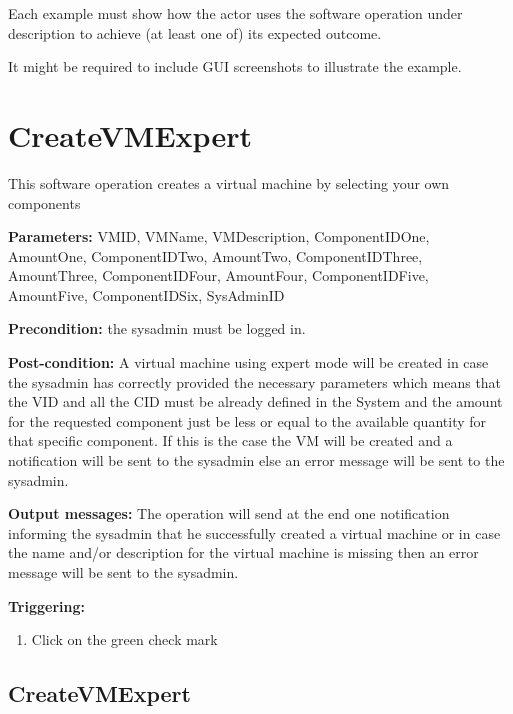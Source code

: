 Each example must show how the actor uses the software operation under
description to achieve (at least one of) its expected outcome.

It might be required to include GUI screenshots to illustrate the example.





\section{CreateVMExpert}
\label{operation:CreateVMExpert}
This software operation creates a virtual machine by selecting your own
components
\begin{description}

\item \textbf{Parameters:} VMID, VMName, VMDescription, ComponentIDOne,
AmountOne, ComponentIDTwo, AmountTwo, ComponentIDThree, AmountThree,
ComponentIDFour, AmountFour, ComponentIDFive, AmountFive,
ComponentIDSix, SysAdminID
\item \textbf{Precondition:} the sysadmin must be logged in.
\item \textbf{Post-condition:} A virtual machine using expert mode will be
created in case the sysadmin has correctly provided the necessary parameters
which means that the VID and all the CID must be already defined in the System
and the amount for the requested component just be less or equal to the
available quantity for that specific component. If this is the case the VM will
be created and a notification will be sent to the sysadmin else an error message
will be sent to the sysadmin.
\item \textbf{Output messages:} The operation will send at the end one
notification informing the sysadmin that he successfully created a virtual
machine or in case the name and/or description for the virtual machine is
missing then an error message will be sent to the sysadmin.

\item \textbf{Triggering:}
\begin{enumerate}
\item Click on the green check mark
\end{enumerate}

 
\end{description}

\subsection{CreateVMExpert}

